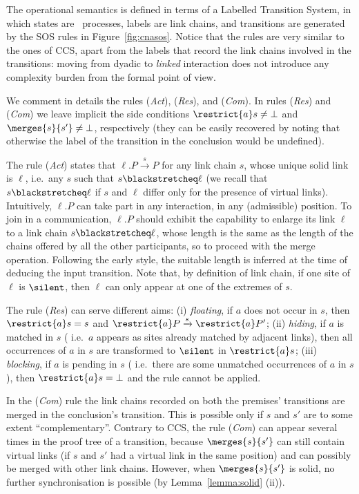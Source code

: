 The operational semantics is defined in terms of a Labelled Transition System, in which states are \CNA\ processes, labels are link chains, and transitions are generated by the SOS rules in Figure~\ref{fig:cnasos}. 
% 
Notice that the rules are very similar to the ones of CCS, 
apart from the labels that record the link chains involved in the transitions:
moving from dyadic to \emph{linked} interaction does not introduce any complexity burden from the formal point of view.

We comment in details the rules (\textit{Act}), (\textit{Res}), and (\textit{Com}). 
In rules (\textit{Res}) and (\textit{Com}) we leave implicit the side conditions $\restrict{a}s \neq \bot$ and $\merges{s}{s'} \neq \bot$, respectively (they can be easily recovered by noting that otherwise the label of the transition in the conclusion would be undefined).

The rule (\textit{Act}) states that $\ell.P \xrightarrow{s} P$ for any link chain $s$, whose unique solid link is $\ell$,  i.e.\  any $s$ such that $s \blackstretcheq \ell$
(we recall that $s \blackstretcheq \ell$ if $s$ and $\ell$  differ only for the presence of virtual links).
Intuitively, $\ell.P$ can take part in any interaction, in any (admissible) position.
To join in a communication, $\ell.P$ should exhibit the capability to enlarge its link $\ell$ to a link chain $s \blackstretcheq \ell$, whose length is the same as the length of the chains offered by all the other participants, so to proceed with the merge operation. Following the early style, the suitable length is 
inferred at the time of deducing the input transition.
Note that, by definition of link chain, if one site of $\ell$ is $\silent$, then $\ell$ can only appear at one of the extremes of $s$.

The rule (\textit{Res}) can serve different aims: 
(i) \emph{floating}, if $a$ does not occur in $s$, then $\restrict{a}s = s$ and  $\restrict{a}P \xrightarrow{s} \restrict{a}P'$;
(ii) \emph{hiding}, if $a$ is matched in $s$ ( i.e.\  $a$ appears as sites already matched by adjacent links), then all occurrences of $a$ in $s$ are transformed to $\silent$ in $\restrict{a}s$;
(iii) \emph{blocking}, if $a$ is pending in $s$ ( i.e.\  there are some
unmatched occurrences of $a$ in $s$), then $\restrict{a}s = \bot$ and the rule cannot be applied.

In the (\textit{Com}) rule the link chains recorded on both the premises' transitions are merged in the conclusion's transition.
This is possible only if $s$ and $s'$ are to some extent ``complementary''.
Contrary to CCS, the rule (\textit{Com}) can appear several times in the proof tree of a transition, because $\merges{s}{s'}$ can still contain virtual links (if $s$ and $s'$ had a virtual link in the same position) and can possibly be merged with other link chains.
However, when $\merges{s}{s'}$ is solid, no further synchronisation is possible (by Lemma~\ref{lemma:solid} (ii)).

